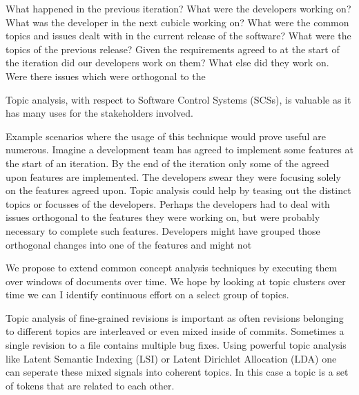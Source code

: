 \documentclass[times, 10pt,twocolumn]{article}
\begin{document}




What happened in the previous iteration? What were the developers
working on? What was the developer in the next cubicle working on?
What were the common topics and issues dealt with in the current
release of the software? What were the topics of the previous release?
Given the requirements agreed to at the start of the iteration did our
developers work on them? What else did they work on. Were there issues
which were orthogonal to the

Topic analysis, with respect to Software Control Systems (SCSs), is
valuable as it has many uses for the stakeholders involved. 

Example scenarios where the usage of this technique would prove useful
are numerous. Imagine a development team has agreed to implement some
features at the start of an iteration. By the end of the iteration
only some of the agreed upon features are implemented. The developers
swear they were focusing solely on the features agreed upon. Topic
analysis could help by teasing out the distinct topics or focusses of
the developers. Perhaps the developers had to deal with issues
orthogonal to the features they were working on, but were probably
necessary to complete such features. Developers might have grouped
those orthogonal changes into one of the features and might not


We propose to extend common concept analysis techniques by executing
them over windows of documents over time. We hope by looking at topic
clusters over time we can I identify continuous effort on a select
group of topics.

Topic analysis of fine-grained revisions is important as often
revisions belonging to different topics are interleaved or even mixed
inside of commits.  Sometimes a single revision to a file contains
multiple bug fixes.  Using powerful topic analysis like Latent
Semantic Indexing (LSI) or Latent Dirichlet Allocation (LDA) one can
seperate these mixed signals into coherent topics. In this case a
topic is a set of tokens that are related to each other.

\end{document}
